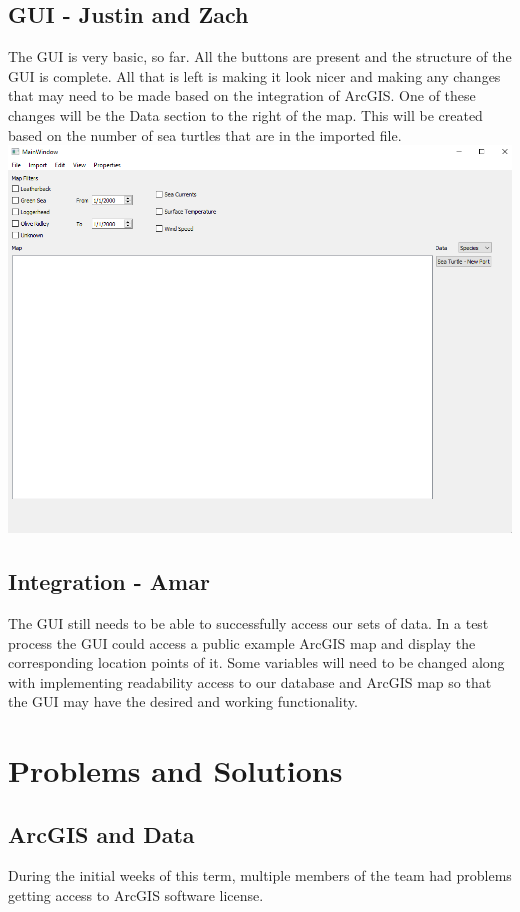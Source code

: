\documentclass[onecolumn, draftclsnofoot,10pt, compsoc]{IEEEtran}
\begin{document}
\subsection{GUI - Justin and Zach}
\par The GUI is very basic, so far. All the buttons are present and the structure of the GUI is complete. All that is left is making it look nicer and making any changes that may need to be made based on the integration of ArcGIS. One of these changes will be the Data section to the right of the map. This will be created based on the number of sea turtles that are in the imported file.
\newline \newline
\includegraphics[scale=0.6]{current-ui.PNG}
\subsection{Integration - Amar}
The GUI still needs to be able to successfully access our sets of data. In a test process the GUI could access a public example ArcGIS map and display the corresponding location points of it. Some variables will need to be changed along with implementing readability access to our database and ArcGIS map so that the GUI may have the desired and working functionality.

\section{Problems and Solutions}
\subsection{ArcGIS and Data}
During the initial weeks of this term, multiple members of the team had problems getting access to ArcGIS software license. 
\end{document}
